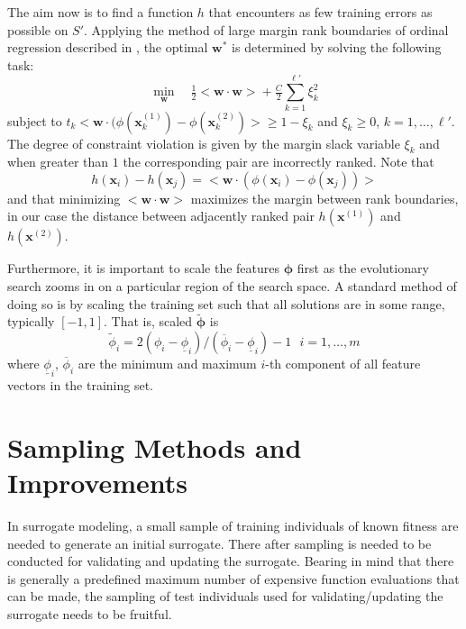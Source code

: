 \documentclass[10pt, conference]{IEEEtran} %
\newcommand{\inner}[2]{\big<{#1}\cdot{#2}\big>}
\renewcommand{\vec}[1]{\mathbf{#1}}
\begin{document}
The aim now is to find a function $h$ that encounters as few training errors as possible on $S'$. Applying the method of large margin rank boundaries of ordinal regression described in \cite{Herbrich00}, the optimal $\vec{w}^*$ is determined by solving the following task:
\begin{equation} 
  \min_{\vec{w}}\quad \tfrac{1}{2}\inner{\vec{w}}{\vec{w}} + \tfrac{C}{2}\sum_{k=1}^{\ell'}\xi_k^2 \label{eq:margin} 
\end{equation}
subject to $t_k\inner{\vec{w}}{(\phi(\vec{x}_k^{(1)})-\phi(\vec{x}_k^{(2)})}\ge 1 - \xi_k$ and $\xi_k \ge 0$, $k = 1,\ldots, \ell'$. The degree of constraint violation is given by the margin slack variable $\xi_k$ and when greater than $1$ the corresponding pair are incorrectly ranked. Note that
\begin{equation} 
  h(\vec{x}_i)-h(\vec{x}_j) = \inner{\vec{w}}{(\phi(\vec{x}_i)-\phi(\vec{x}_j))} 
\end{equation}
and that minimizing $\inner{\vec{w}}{\vec{w}}$ maximizes the margin between rank boundaries, in our case the distance between adjacently ranked pair $h(\vec{x}^{(1)})$ and $h(\vec{x}^{(2)})$.

Furthermore, it is important to scale the features $\vec{\phi}$ first as the evolutionary search zooms in on a particular region of the search space. A standard method of doing so is by scaling the training set such that all solutions are in some range, typically $[-1,1]$. That is, scaled $\tilde{\vec{\phi}}$ is
\begin{equation}\label{eq:scale}
  \tilde \phi_i = 2 (\phi_i - \underline{\phi}_i) / (\overline{\phi}_i - \underline{\phi}_i) - 1 ~~~ i = 1,\ldots,m
\end{equation}
where $\underline{\phi}_i$, $\overline{\phi}_i$ are the minimum and maximum $i$-th component of all feature vectors in the training set. 

\section{Sampling Methods and Improvements}\label{sec:samplingstopping}
In surrogate modeling, a small sample of training individuals of known fitness are needed to generate an initial surrogate. There after sampling is needed to be conducted for validating and updating the surrogate. Bearing in mind that there is generally a predefined maximum number of expensive function evaluations that can be made, the sampling of test individuals  used for validating/updating the surrogate needs to be fruitful. 
\end{document}
